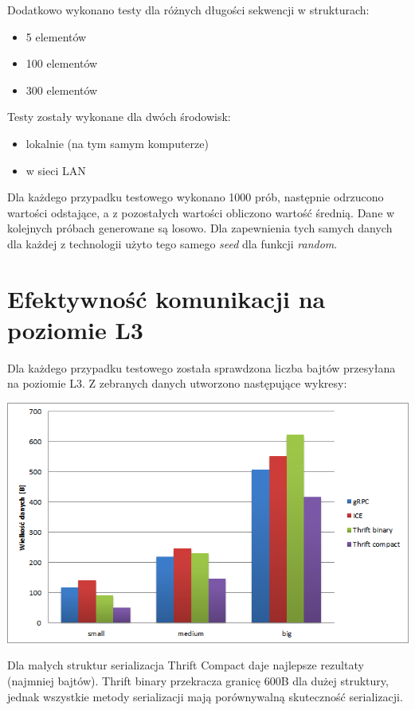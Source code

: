 \documentclass[12pt]{article}
\begin{document}
Dodatkowo wykonano testy dla różnych długości sekwencji w strukturach:
\begin{itemize}
    \item 5 elementów
    \item 100 elementów
    \item 300 elementów
\end{itemize}
\vspace{\baselineskip}

Testy zostały wykonane dla dwóch środowisk:
\begin{itemize}
    \item lokalnie (na tym samym komputerze)
    \item w sieci LAN
\end{itemize}

Dla każdego przypadku testowego wykonano 1000 prób, następnie odrzucono wartości odstające, a z pozostałych wartości obliczono wartość średnią. Dane w kolejnych próbach generowane są losowo. Dla zapewnienia tych samych danych dla każdej z technologii użyto tego samego \emph{seed} dla funkcji \emph{random}.

\newpage
\section{Efektywność komunikacji na poziomie L3}
Dla każdego przypadku testowego została sprawdzona liczba bajtów przesyłana na poziomie L3. Z zebranych danych utworzono następujące wykresy:

\begin{center}
\centering
    \includegraphics{bytes_5.png}
\end{center}

Dla małych struktur serializacja Thrift Compact daje najlepsze rezultaty (najmniej bajtów). Thrift binary przekracza granicę 600B dla dużej struktury, jednak wszystkie metody serializacji mają porównywalną skuteczność serializacji.
\end{document}
